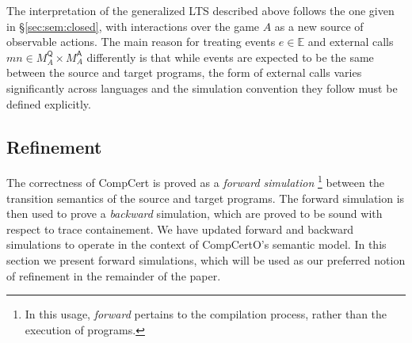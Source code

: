 \documentclass[sigplan,10pt,review,anonymous]{acmart}
\newcommand{\kw}[1]{\ensuremath{ \mathsf{#1} }}
\newcommand{\bind}{\gg\!\!=}
\begin{document}
The interpretation of the generalized LTS described above
follows the one given in \S\ref{sec:sem:closed},
with interactions over the game $A$
as a new source of observable actions.
The main reason for treating
events $e \in \mathbb{E}$ and
external calls $m n \in M_A^\kw{Q} \times M_A^\kw{A}$
differently is that
while events are expected to be the same
between the source and target programs,
the form of external calls varies significantly
across languages
and the simulation convention they follow
must be defined explicitly.




\subsection{Refinement} \label{sec:sem:ref} %

The correctness of CompCert is proved as a
\emph{forward simulation}%
\footnote{In this usage, \emph{forward} pertains to
  the compilation process,
  rather than the execution of programs.}
between the transition semantics of the source and target programs.
The forward simulation is then used to prove a \emph{backward} simulation,
which are proved to be sound with respect to trace containement.
We have updated forward and backward simulations to
operate in the context of CompCertO's semantic model.
In this section we present forward simulations,
which will be used as our preferred notion of refinement
in the remainder of the paper.
\end{document}
